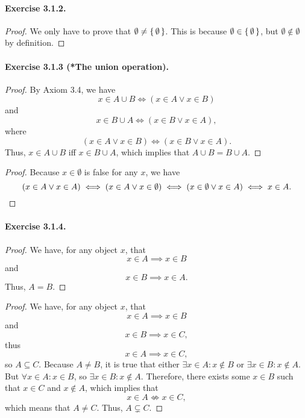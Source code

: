 \paragraph{Exercise 3.1.2.}
\begin{proof}
    We only have to prove that $\emptyset \neq \set{\emptyset}$. This is because $\emptyset \in \set{\emptyset}$, but $\emptyset \notin \emptyset$ by definition.
\end{proof}

\paragraph{Exercise 3.1.3 (*The union operation).}
\begin{proof}
    By Axiom 3.4, we have \[x\in A\cup B \iff (x\in A \lor x\in B)\] and \[x\in B\cup A \iff (x\in B \lor x\in A),\] where \[(x\in A \lor x\in B) \iff (x\in B \lor x\in A).\] Thus, $x\in A\cup B$ iff $x\in B\cup A$, which implies that $A\cup B=B\cup A$.
\end{proof}
\begin{proof}
    Because $x\in \emptyset$ is false for any $x$, we have \[(x\in A \lor x\in A) \iff (x\in A \lor x\in \emptyset) \iff (x\in \emptyset \lor x\in A) \iff x\in A. \qedhere\]
\end{proof}

\paragraph{Exercise 3.1.4.}
\begin{proof}
    We have, for any object $x$, that \[ x\in A \implies x \in B \] and \[ x\in B \implies x \in A .\] Thus, $A=B$.
\end{proof}
\begin{proof}
    We have, for any object $x$, that \[ x\in A \implies x \in B \] and \[ x\in B \implies x \in C , \] thus \[ x\in A \implies x \in C ,\] so $A\subseteq C$. Because $A\neq B$, it is true that either $\exists x\in A: x\notin B$ or $\exists x\in B: x\notin A$. But $\forall x\in A: x \in B$, so $\exists x\in B: x\notin A$. Therefore, there exists some $x\in B$ such that $x\in C$ and $x\notin A$, which implies that \[ x\in A \not\iff x\in C ,\] which means that $A\neq C$. Thus, $A\subsetneq C$.
\end{proof}

